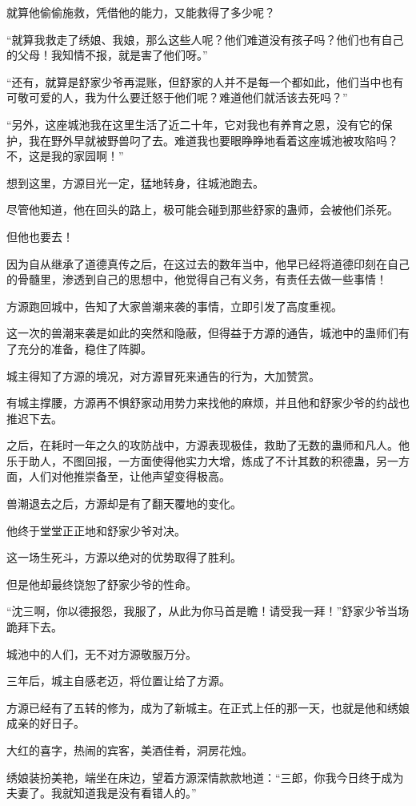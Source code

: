 \begin{this_body}
就算他偷偷施救，凭借他的能力，又能救得了多少呢？

“就算我救走了绣娘、我娘，那么这些人呢？他们难道没有孩子吗？他们也有自己的父母！我知情不报，就是害了他们呀。”

“还有，就算是舒家少爷再混账，但舒家的人并不是每一个都如此，他们当中也有可敬可爱的人，我为什么要迁怒于他们呢？难道他们就活该去死吗？”

“另外，这座城池我在这里生活了近二十年，它对我也有养育之恩，没有它的保护，我在野外早就被野兽叼了去。难道我也要眼睁睁地看着这座城池被攻陷吗？不，这是我的家园啊！”

想到这里，方源目光一定，猛地转身，往城池跑去。

尽管他知道，他在回头的路上，极可能会碰到那些舒家的蛊师，会被他们杀死。

但他也要去！

因为自从继承了道德真传之后，在这过去的数年当中，他早已经将道德印刻在自己的骨髓里，渗透到自己的思想中，他觉得自己有义务，有责任去做一些事情！

方源跑回城中，告知了大家兽潮来袭的事情，立即引发了高度重视。

这一次的兽潮来袭是如此的突然和隐蔽，但得益于方源的通告，城池中的蛊师们有了充分的准备，稳住了阵脚。

城主得知了方源的境况，对方源冒死来通告的行为，大加赞赏。

有城主撑腰，方源再不惧舒家动用势力来找他的麻烦，并且他和舒家少爷的约战也推迟下去。

之后，在耗时一年之久的攻防战中，方源表现极佳，救助了无数的蛊师和凡人。他乐于助人，不图回报，一方面使得他实力大增，炼成了不计其数的积德蛊，另一方面，人们对他推崇备至，让他声望变得极高。

兽潮退去之后，方源却是有了翻天覆地的变化。

他终于堂堂正正地和舒家少爷对决。

这一场生死斗，方源以绝对的优势取得了胜利。

但是他却最终饶恕了舒家少爷的性命。

“沈三啊，你以德报怨，我服了，从此为你马首是瞻！请受我一拜！”舒家少爷当场跪拜下去。

城池中的人们，无不对方源敬服万分。

三年后，城主自感老迈，将位置让给了方源。

方源已经有了五转的修为，成为了新城主。在正式上任的那一天，也就是他和绣娘成亲的好日子。

大红的喜字，热闹的宾客，美酒佳肴，洞房花烛。

绣娘装扮美艳，端坐在床边，望着方源深情款款地道：“三郎，你我今日终于成为夫妻了。我就知道我是没有看错人的。”


\end{this_body}
